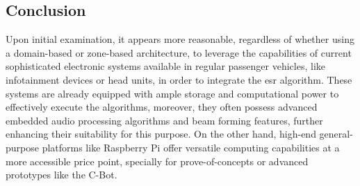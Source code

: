\subsection{Conclusion}
\label{subsec:ECU_conclusion}

Upon initial examination, it appears more reasonable, regardless of whether using a domain-based or zone-based architecture, to leverage the capabilities of current sophisticated electronic systems available in regular passenger vehicles, like infotainment devices or head units, in order to integrate the \gls{esr} algorithm. These systems are already equipped with ample storage and computational power to effectively execute the algorithms, moreover, they often possess advanced embedded audio processing algorithms and beam forming features, further enhancing their suitability for this purpose.%
On the other hand, high-end general-purpose platforms like Raspberry Pi offer versatile computing capabilities at a more accessible price point, specially for prove-of-concepts or advanced prototypes like the C-Bot.

